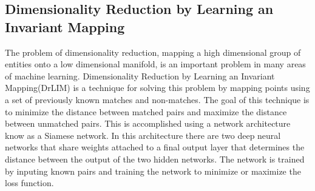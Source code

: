 \subsection{Dimensionality Reduction by Learning an Invariant Mapping}

The problem of dimensionality reduction, mapping a high dimensional group of entities onto a low dimensional manifold, is an important problem in many areas of machine learning. Dimensionality Reduction by Learning an Invariant Mapping(DrLIM) is a technique for solving this problem by mapping points using a set of previously known matches and non-matches.\cite{Hasdell:Siamese} The goal of this technique is to minimize the distance between matched pairs and maximize the distance between unmatched pairs. This is accomplished using a network architecture know as a Siamese network. In this architecture there are two deep neural networks that share weights attached to a final output layer that determines the distance between the output of the two hidden networks. The network is trained by inputing known pairs and training the network to minimize or maximize the loss function. 
